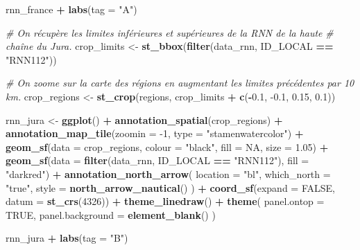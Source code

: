 \documentclass[
  french,
]{book}
\newenvironment{Shaded}{\begin{snugshade}}{\end{snugshade}}
\newcommand{\CommentTok}[1]{\textcolor[rgb]{0.56,0.35,0.01}{\textit{#1}}}
\newcommand{\DataTypeTok}[1]{\textcolor[rgb]{0.13,0.29,0.53}{#1}}
\newcommand{\DecValTok}[1]{\textcolor[rgb]{0.00,0.00,0.81}{#1}}
\newcommand{\FloatTok}[1]{\textcolor[rgb]{0.00,0.00,0.81}{#1}}
\newcommand{\KeywordTok}[1]{\textcolor[rgb]{0.13,0.29,0.53}{\textbf{#1}}}
\newcommand{\NormalTok}[1]{#1}
\newcommand{\OperatorTok}[1]{\textcolor[rgb]{0.81,0.36,0.00}{\textbf{#1}}}
\newcommand{\OtherTok}[1]{\textcolor[rgb]{0.56,0.35,0.01}{#1}}
\newcommand{\StringTok}[1]{\textcolor[rgb]{0.31,0.60,0.02}{#1}}
\begin{document}
\begin{Shaded}
\begin{Highlighting}[]
\NormalTok{rnn\_france }\OperatorTok{+}\StringTok{ }\KeywordTok{labs}\NormalTok{(}\DataTypeTok{tag =} \StringTok{"A"}\NormalTok{)}

\CommentTok{\# On récupère les limites inférieures et supérieures de la RNN de la haute}
\CommentTok{\# chaîne du Jura.}
\NormalTok{crop\_limits \textless{}{-}}\StringTok{ }\KeywordTok{st\_bbox}\NormalTok{(}\KeywordTok{filter}\NormalTok{(data\_rnn, ID\_LOCAL }\OperatorTok{==}\StringTok{ "RNN112"}\NormalTok{))}

\CommentTok{\# On zoome sur la carte des régions en augmentant les limites précédentes par 10 km.}
\NormalTok{crop\_regions \textless{}{-}}\StringTok{ }\KeywordTok{st\_crop}\NormalTok{(regions, crop\_limits }\OperatorTok{+}\StringTok{ }\KeywordTok{c}\NormalTok{(}\OperatorTok{{-}}\FloatTok{0.1}\NormalTok{, }\FloatTok{{-}0.1}\NormalTok{, }\FloatTok{0.15}\NormalTok{, }\FloatTok{0.1}\NormalTok{))}

\NormalTok{rnn\_jura \textless{}{-}}\StringTok{ }\KeywordTok{ggplot}\NormalTok{() }\OperatorTok{+}
\StringTok{  }\KeywordTok{annotation\_spatial}\NormalTok{(crop\_regions) }\OperatorTok{+}
\StringTok{  }\KeywordTok{annotation\_map\_tile}\NormalTok{(}\DataTypeTok{zoomin =} \DecValTok{{-}1}\NormalTok{, }\DataTypeTok{type =} \StringTok{"stamenwatercolor"}\NormalTok{) }\OperatorTok{+}
\StringTok{  }\KeywordTok{geom\_sf}\NormalTok{(}\DataTypeTok{data =}\NormalTok{ crop\_regions, }\DataTypeTok{colour =} \StringTok{"black"}\NormalTok{, }\DataTypeTok{fill =} \OtherTok{NA}\NormalTok{, }\DataTypeTok{size =} \FloatTok{1.05}\NormalTok{) }\OperatorTok{+}
\StringTok{  }\KeywordTok{geom\_sf}\NormalTok{(}\DataTypeTok{data =} \KeywordTok{filter}\NormalTok{(data\_rnn, ID\_LOCAL }\OperatorTok{==}\StringTok{ "RNN112"}\NormalTok{), }\DataTypeTok{fill =} \StringTok{"darkred"}\NormalTok{) }\OperatorTok{+}
\StringTok{  }\KeywordTok{annotation\_north\_arrow}\NormalTok{(}
    \DataTypeTok{location =} \StringTok{"bl"}\NormalTok{,}
    \DataTypeTok{which\_north =} \StringTok{"true"}\NormalTok{,}
    \DataTypeTok{style =} \KeywordTok{north\_arrow\_nautical}\NormalTok{()}
\NormalTok{  ) }\OperatorTok{+}
\StringTok{  }\KeywordTok{coord\_sf}\NormalTok{(}\DataTypeTok{expand =} \OtherTok{FALSE}\NormalTok{, }\DataTypeTok{datum =} \KeywordTok{st\_crs}\NormalTok{(}\DecValTok{4326}\NormalTok{)) }\OperatorTok{+}
\StringTok{  }\KeywordTok{theme\_linedraw}\NormalTok{() }\OperatorTok{+}
\StringTok{  }\KeywordTok{theme}\NormalTok{(}
    \DataTypeTok{panel.ontop =} \OtherTok{TRUE}\NormalTok{,}
    \DataTypeTok{panel.background =} \KeywordTok{element\_blank}\NormalTok{()}
\NormalTok{  )}

\NormalTok{rnn\_jura }\OperatorTok{+}\StringTok{ }\KeywordTok{labs}\NormalTok{(}\DataTypeTok{tag =} \StringTok{"B"}\NormalTok{)}
\end{Highlighting}
\end{Shaded}
\end{document}
